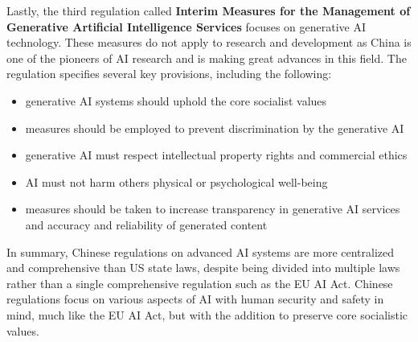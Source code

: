 Lastly, the third regulation called \textbf{Interim Measures for the Management of Generative Artificial Intelligence Services} \cite{InterimMeasuresGenerativeAI2023, CACGenerativeAIInterim2023} focuses on generative AI technology. These measures do not apply to research and development as China is one of the pioneers of AI research and is making great advances in this field. The regulation specifies several key provisions, including the following:
\begin{itemize}
    \item generative AI systems should uphold the core socialist values
    \item measures should be employed to prevent discrimination by the generative AI
    \item generative AI must respect intellectual property rights and commercial ethics
    \item AI must not harm others physical or psychological well-being
    \item measures should be taken to increase transparency in generative AI services and accuracy and reliability of generated content
\end{itemize}

In summary, Chinese regulations on advanced AI systems are more centralized and comprehensive than US state laws, despite being divided into multiple laws rather than a single comprehensive regulation such as the EU AI Act. Chinese regulations focus on various aspects of AI with human security and safety in mind, much like the EU AI Act, but with the addition to preserve core socialistic values.
